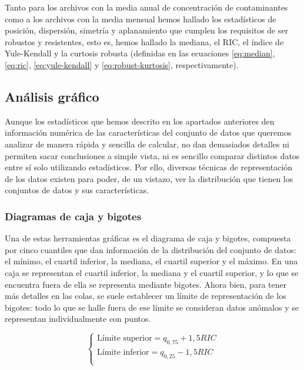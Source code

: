 \documentclass[12pt]{article}
\begin{document}
Tanto para los archivos con la media anual de concentración de contaminantes como a los archivos con la media mensual hemos hallado los estadísticos de posición, dispersión, simetría y aplanamiento que cumplen los requisitos de ser robustos y resistentes, esto es, hemos hallado la mediana, el RIC, el índice de Yule-Kendall y la curtosis robusta (definidas en las ecuaciones \ref{eq:median}, \ref{eq:ric}, \ref{eq:yule-kendall} y \ref{eq:robust-kurtosis}, respectivamente).

\subsection{Análisis gráfico}

Aunque los estadísticos que hemos descrito en los apartados anteriores den información numérica de las características del conjunto de datos que queremos analizar de manera rápida y sencilla de calcular, no dan demasiados detalles ni permiten sacar conclusiones a simple vista, ni es sencillo comparar distintos datos entre sí solo utilizando estadísticos. Por ello, diversas técnicas de representación de los datos existen para poder, de un vistazo, ver la distribución que tienen los conjuntos de datos y sus características.

\subsubsection{Diagramas de caja y bigotes}

Una de estas herramientas gráficas es el diagrama de caja y bigotes, compuesta por cinco cuantiles que dan información de la distribución del conjunto de datos: el mínimo, el cuartil inferior, la mediana, el cuartil superior y el máximo. En una caja se representan el cuartil inferior, la mediana y el cuartil superior, y lo que se encuentra fuera de ella se representa mediante bigotes. Ahora bien, para tener más detalles en las colas, se suele establecer un límite de representación de los bigotes: todo lo que se halle fuera de ese límite se consideran datos anómalos y se representan individualmente con puntos.

\begin{equation}
\begin{cases}
\text{Límite superior} = q_{0,75} + 1,5 RIC \\
\text{Límite inferior} = q_{0,25} - 1,5 RIC \\
\end{cases}
\label{boxplot_fence}
\end{equation}
\end{document}
